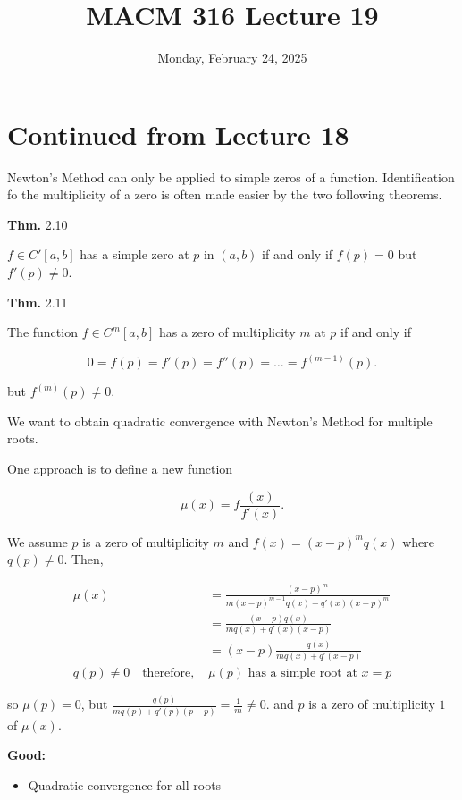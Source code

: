 \documentclass[12pt]{article}
\newcommand{\thm}{\textbf{Thm.}\xspace}
\begin{document}
\title{MACM 316 Lecture 19}
\date{Monday, February 24, 2025}

\maketitle

\section{Continued from Lecture 18}

Newton's Method can only be applied to simple zeros of a function.
Identification fo the multiplicity of a zero is often made easier by the two
following theorems.

\thm 2.10

$f\in C'[a,b]$ has a simple zero at $p$ in $(a,b)$ if and only if $f(p) = 0$
but $f'(p) \neq 0$.

\thm 2.11

The function $f\in C^m[a,b]$ has a zero of multiplicity $m$ at $p$ if and only
if 

\[
  0 = f(p) = f'(p) = f''(p) = \dots = f^{(m-1)}(p)
.\]

but $f^{(m)}(p) \neq 0$.

We want to obtain quadratic convergence with Newton's Method for multiple roots.

One approach is to define a new function

\[
  \mu(x) = f\frac{(x)}{f'(x)}
.\]

We assume $p$ is a zero of multiplicity $m$ and $f(x) = (x-p)^m q(x)$ where
$q(p) \neq 0$. Then,

\begin{align*}
  \mu(x) &= \frac{(x-p)^m}{m(x-p)^{m-1} q(x) + q'(x)(x-p)^m} \\
  &= \frac{(x-p)q(x)}{mq(x) + q'(x) (x-p)}  \\
  &= (x-p) \frac{q(x)}{mq(x)+q'(x-p)} \\
  q(p) \neq 0 \quad\text{therefore, } &\mu(p) \text{ has a simple root at } x=p
\end{align*}

so $\mu(p) = 0$, but $\displaystyle \frac{q(p)}{mq(p) + q'(p)(p-p)} = \frac{1}{m} \neq 0$.
and $p$ is a zero of multiplicity $1$ of $\mu(x)$.

\textbf{Good:}
\begin{itemize}
  \item Quadratic convergence for all roots
\end{itemize}
\end{document}
